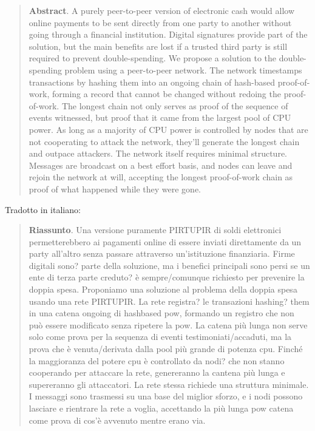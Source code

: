\documentclass {article}
\begin{document}
\begin {quote}

\textbf {Abstract}. A purely peer-to-peer version of electronic cash would allow online payments to be sent directly from one party to another without going through a financial institution.
Digital signatures provide part of the solution, but the main benefits are lost if a trusted third party is still required to prevent double-spending.
We propose a solution to the double-spending problem using a peer-to-peer network.
The network timestamps transactions by hashing them into an ongoing chain of hash-based proof-of-work, forming a record that cannot be changed without redoing the proof-of-work.
The longest chain not only serves as proof of the sequence of events witnessed, but proof that it came from the largest pool of CPU power.
As long as a majority of CPU power is controlled by nodes that are not cooperating to attack the network, they'll generate the longest chain and outpace attackers.
The network itself requires minimal structure.
Messages are broadcast on a best effort basis, and nodes can leave and rejoin the network at will, accepting the longest proof-of-work chain as proof of what happened while they were gone.

\end {quote}

Tradotto in italiano:

\begin {quote}

\textbf {Riassunto}. Una versione puramente PIRTUPIR di soldi elettronici permetterebbero ai pagamenti online di essere inviati direttamente da un party all'altro senza passare attraverso un'istituzione finanziaria.
Firme digitali sono? parte della soluzione, ma i benefici principali sono persi se un ente di terza parte creduto? è sempre/comunque richiesto per prevenire la doppia spesa.
Proponiamo una soluzione al problema della doppia spesa usando una rete PIRTUPIR.
La rete registra? le transazioni hashing? them in una catena ongoing di hashbased pow, formando un registro che non può essere modificato senza ripetere la pow.
La catena più lunga non serve solo come prova per la sequenza di eventi testimoniati/accaduti, ma la prova che è venuta/derivata dalla pool più grande di potenza cpu. Finché la maggioranza del potere cpu è controllato da nodi? che non stanno cooperando per attaccare la rete, genereranno la cantena più lunga e supereranno gli attaccatori.
La rete stessa richiede una struttura minimale.
I messaggi sono trasmessi su una base del miglior sforzo, e i nodi possono lasciare e rientrare la rete a voglia, accettando la più lunga pow catena come prova di cos'è avvenuto mentre erano via.

\end {quote}
\end{document}
